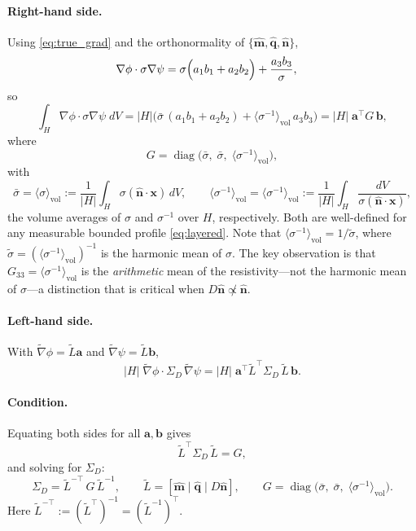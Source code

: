 \documentclass[11pt]{article}
\newcommand{\nn}{\hat{\bm{n}}}
\newcommand{\mm}{\hat{\bm{m}}}
\newcommand{\qq}{\hat{\bm{q}}}
\newcommand{\tL}{\widetilde{L}}
\newcommand{\SD}{\Sigma_D}
\newcommand{\sbar}{\bar{\sigma}}
\newcommand{\stilde}{\widetilde{\sigma}}
\newcommand{\invs}{\langle\sigma^{-1}\rangle_{\mathrm{vol}}}
\newcommand{\tvnabla}{\widetilde{\nabla}}
\begin{document}
\paragraph{Right-hand side.}
Using \eqref{eq:true_grad} and the orthonormality of $\{\mm,\qq,\nn\}$,
\begin{align*}
    \nabla\phi\cdot\sigma\nabla\psi
    &= \sigma\Bigl(a_1 b_1 + a_2 b_2\Bigr)
     + \frac{a_3 b_3}{\sigma},
\end{align*}
so
\[
    \int_H \nabla\phi\cdot\sigma\nabla\psi\;dV
    = |H|\bigl(\sbar\,(a_1 b_1+a_2 b_2) + \invs\, a_3 b_3\bigr)
    = |H|\;\bm{a}^\top G\,\bm{b},
\]
where
\begin{equation}\label{eq:G}
    G = \operatorname{diag}\!\bigl(\sbar,\;\sbar,\;\invs\bigr),
\end{equation}
with
\[
    \sbar = \langle\sigma\rangle_{\mathrm{vol}} := \frac{1}{|H|}\int_H \sigma(\nn\cdot\bm{x})\,dV,
    \qquad
    \invs = \langle\sigma^{-1}\rangle_{\mathrm{vol}} := \frac{1}{|H|}\int_H \frac{dV}{\sigma(\nn\cdot\bm{x})},
\]
the volume averages of $\sigma$ and $\sigma^{-1}$ over $H$, respectively.
Both are well-defined for any measurable bounded profile \eqref{eq:layered}.
Note that $\invs = 1/\stilde$, where $\stilde = (\invs)^{-1}$ is the harmonic
mean of $\sigma$.  The key observation is that $G_{33} = \invs$ is the
\emph{arithmetic} mean of the resistivity---not the harmonic mean of
$\sigma$---a distinction that is critical when $D\nn \not\propto \nn$.

\paragraph{Left-hand side.}
With $\tvnabla\phi = \tL\bm{a}$ and $\tvnabla\psi = \tL\bm{b}$,
\[
    |H|\;\tvnabla\phi\cdot\SD\,\tvnabla\psi
    = |H|\;\bm{a}^\top\tL^\top\SD\,\tL\,\bm{b}.
\]

\paragraph{Condition.}
Equating both sides for all $\bm{a},\bm{b}$ gives
\[
    \tL^\top\SD\,\tL = G,
\]
and solving for $\SD$:
\begin{equation}\label{eq:SigmaD}
    \boxed{
    \SD = \tL^{-\top}\,G\,\tL^{-1},
    \qquad
    \tL = [\mm\mid\qq\mid D\nn],
    \qquad
    G = \operatorname{diag}\!\bigl(\sbar,\;\sbar,\;\invs\bigr).
    }
\end{equation}
Here $\tL^{-\top} := (\tL^\top)^{-1} = (\tL^{-1})^\top$.
\end{document}
